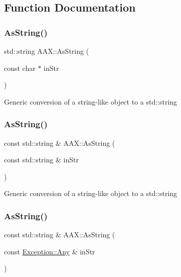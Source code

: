 \subsection{Function Documentation}
\mbox{\label{a00852_a8fbde5607de487515bcb55631bc1377d}} 
\subsubsection{\texorpdfstring{AsString()}{AsString()}\hspace{0.1cm}{\footnotesize\ttfamily [1/3]}}
{\footnotesize\ttfamily std\+::string A\+A\+X\+::\+As\+String (\begin{DoxyParamCaption}\item[{const char $\ast$}]{in\+Str }\end{DoxyParamCaption})\hspace{0.3cm}{\ttfamily [inline]}}

Generic conversion of a string-\/like object to a std\+::string \mbox{\label{a00852_a1bdf9d0d3be5b5f11d47df256a2e9490}} 
\subsubsection{\texorpdfstring{AsString()}{AsString()}\hspace{0.1cm}{\footnotesize\ttfamily [2/3]}}
{\footnotesize\ttfamily const std\+::string \& A\+A\+X\+::\+As\+String (\begin{DoxyParamCaption}\item[{const std\+::string \&}]{in\+Str }\end{DoxyParamCaption})\hspace{0.3cm}{\ttfamily [inline]}}





Generic conversion of a string-\/like object to a std\+::string \mbox{\label{a00852_a9d87a7ed401f9deb8386a14c7bd8aaae}} 
\subsubsection{\texorpdfstring{AsString()}{AsString()}\hspace{0.1cm}{\footnotesize\ttfamily [3/3]}}
{\footnotesize\ttfamily const std\+::string \& A\+A\+X\+::\+As\+String (\begin{DoxyParamCaption}\item[{const \mbox{\hyperlink{a01593}{Exception\+::\+Any}} \&}]{in\+Str }\end{DoxyParamCaption})\hspace{0.3cm}{\ttfamily [inline]}}





